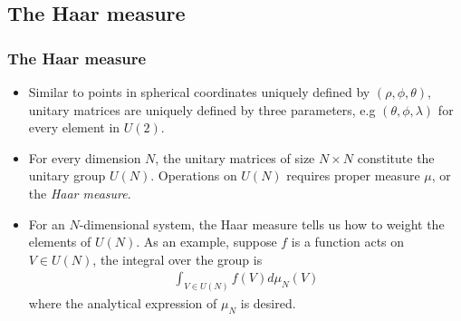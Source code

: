 \documentclass{beamer}
\begin{document}
\subsection{The Haar measure}
\begin{frame}
  \frametitle{The Haar measure}
  \begin{itemize}
    \item Similar to points in spherical coordinates uniquely defined by $(\rho, \phi,\theta)$, unitary matrices are uniquely defined by three parameters, e.g $(\theta,\phi,\lambda)$ for every element in $U(2)$.
    \item For every dimension $N$, the unitary matrices of size $N\times N$ constitute the unitary group $U(N)$. Operations on $U(N)$ requires proper measure $\mu$, or the \textit{Haar measure}.
    \item For an $N$-dimensional system, the Haar measure tells us how to weight the elements of $U(N)$. As an example, suppose $f$ is a function acts on $V\in U(N)$, the integral over the group is
    \begin{align} 
      \int_{V\in U(N)} f(V)d\mu_N(V)
    \end{align}
    where the analytical expression of $\mu_N$ is desired.
  \end{itemize}
\end{frame}
\end{document}
